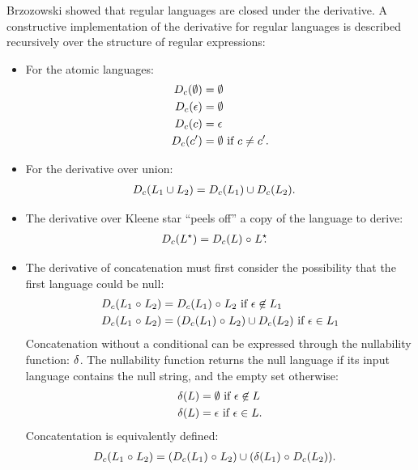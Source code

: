 Brzozowski showed that regular languages are
closed under the derivative.
%
A constructive implementation of the derivative for regular languages is
described recursively over the structure of regular expressions:
\begin{itemize}

\item
For the atomic languages:
\begin{align*}
  D_c(\emptyset) &= \emptyset
  \\
  D_c(\epsilon) &= \emptyset
  \\
  D_c(c) &= \epsilon
  \\
  D_c(c') &= \emptyset \text { if } c \neq c'
  \text.
\end{align*}

\item
For the derivative over union:
\begin{align*}
  D_c(L_1 \cup L_2) &= D_c(L_1) \cup D_c(L_2)
  \text.
\end{align*}

\item
The derivative over Kleene star ``peels off'' a copy of the language to derive:
\begin{align*}
  D_c(L^\star) &=
  D_c(L) \mathrel{\circ} L^\star\!\!
  \text.
\end{align*}


\item
The derivative of concatenation must first consider the possibility that the
first language could be null:
\begin{align*}
 D_c(L_1 \mathrel{\circ} L_2)  
 &= 
 D_c(L_1) \mathrel{\circ} L_2 \text{ if } \epsilon \not\in L_1 
 \\
 D_c(L_1 \mathrel{\circ} L_2)  
 &= 
 (D_c(L_1) \mathrel{\circ} L_2)
  \cup
 D_c(L_2)
 \text{ if } \epsilon \in L_1 
\end{align*}
%
Concatenation without a conditional can be expressed through the nullability
function: $\delta$.
%
The nullability function returns the null language if its input language
contains the null string, and the empty set otherwise:
\begin{align*}
  \delta(L) &= \emptyset \text{ if } \epsilon \not\in L
  \\
  \delta(L) &= \epsilon \text{ if } \epsilon \in L
  \text.
\end{align*}
Concatentation is equivalently defined:
\begin{align*}
 D_c(L_1 \mathrel{\circ} L_2)  
 &= 
 (D_c(L_1) \mathrel{\circ} L_2)
  \cup
 (\delta(L_1) \mathrel{\circ} D_c(L_2))
 \text.
\end{align*}


\end{itemize}


